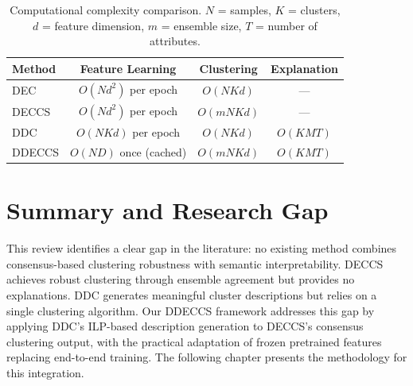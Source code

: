 \begin{table}[H]
    \centering
    \caption{Computational complexity comparison. $N$ = samples, $K$ = clusters, $d$ = feature dimension, $m$ = ensemble size, $T$ = number of attributes.}
    \label{tab:complexity}
    \begin{tabular}{lccc}
        \hline
        \textbf{Method} & \textbf{Feature Learning} & \textbf{Clustering} & \textbf{Explanation} \\
        \hline
        DEC & $O(Nd^2)$ per epoch & $O(NKd)$ & --- \\
        DECCS & $O(Nd^2)$ per epoch & $O(mNKd)$ & --- \\
        DDC & $O(NKd)$ per epoch & $O(NKd)$ & $O(KMT)$ \\
        DDECCS & $O(ND)$ once (cached) & $O(mNKd)$ & $O(KMT)$ \\
        \hline
    \end{tabular}
\end{table}

\section{Summary and Research Gap}

This review identifies a clear gap in the literature: no existing method combines consensus-based clustering robustness with semantic interpretability. DECCS achieves robust clustering through ensemble agreement but provides no explanations. DDC generates meaningful cluster descriptions but relies on a single clustering algorithm. Our DDECCS framework addresses this gap by applying DDC's ILP-based description generation to DECCS's consensus clustering output, with the practical adaptation of frozen pretrained features replacing end-to-end training. The following chapter presents the methodology for this integration.